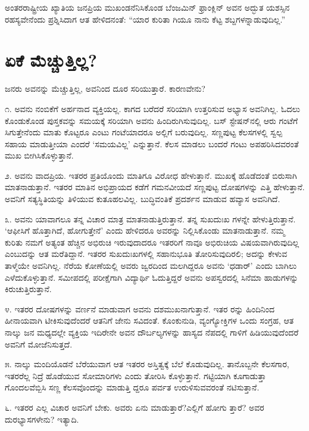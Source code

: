 ಅಂತರರಾಷ್ಟ್ರೀಯ ಖ್ಯಾತಿಯ ಜನಪ್ರಿಯ ಮುಖಂಡನೆನಿಸಿಕೊಂಡ ಬೆಂಜಮಿನ್ ಫ್ರಾಂಕ್ಲಿನ್ ಅವನ ಅದ್ಭುತ ಯಶಸ್ಸಿನ ರಹಸ್ಯವೇನೆಂದು ಪ್ರಶ್ನಿಸಿದಾಗ ಆತ ಹೇಳಿದನಂತೆ: “ಯಾರ ಕುರಿತಾ ಗಿಯೂ ನಾನು ಕೆಟ್ಟ ಶಬ್ದಗಳನ್ನಾಡುವುದಿಲ್ಲ.”


\section{ಏಕೆ ಮೆಚ್ಚುತ್ತಿಲ್ಲ?}

ಜನರು ಅವನನ್ನು ಮೆಚ್ಚುತ್ತಿಲ್ಲ, ಅವನಿಂದ ದೂರ ಸರಿಯುತ್ತಾರೆ. ಕಾರಣವೇನು?

೧. ಅವನು ನಂಬಿಕೆಗೆ ಅರ್ಹನಾದ ವ್ಯಕ್ತಿಯಲ್ಲ. ಕಾಗದ ಬರೆದರೆ ಸರಿಯಾಗಿ ಉತ್ತರಿಸುವ ಅಭ್ಯಾಸ ಅವನಿಗಿಲ್ಲ. ಓದಲು ಕೊಂಡುಕೊಂಡ ಪುಸ್ತಕವನ್ನು ಸಮಯಕ್ಕೆ ಸರಿಯಾಗಿ ಅವನು ಹಿಂದಿರುಗಿಸುವುದಿಲ್ಲ. ಬಸ್ ಸ್ಟೇಷನ್​ನಲ್ಲಿ ಆರು ಗಂಟೆಗೆ ಸಿಗುತ್ತೇನೆಂದು ಮಾತು ಕೊಟ್ಟರೂ ಎಂಟು ಗಂಟೆಯಾದರೂ ಅಲ್ಲಿಗೆ ಬರುವುದಿಲ್ಲ. ಸಣ್ಣಪುಟ್ಟ ಕೆಲಸಗಳಲ್ಲಿ ಸ್ವಲ್ಪ ಸಹಾಯ ಮಾಡುತ್ತೀಯಾ ಎಂದರೆ ‘ಸಮಯವಿಲ್ಲ’ ಎನ್ನುತ್ತಾನೆ. ಕೆಲಸ ಮಾಡಲು ಬಂದರೆ ಗಂಟು ಅಪಹರಿಸಿದವರಂತೆ ಮುಖ ಬೀಗಿಸಿಕೊಳ್ಳುತ್ತಾನೆ.

೨. ಅವನು ವಾದಪ್ರಿಯ. ಇತರರ ಪ್ರತಿಯೊಂದು ಮಾತಿಗೂ ವಿರೋಧ ಹೇಳುತ್ತಾನೆ. ಮುಖಕ್ಕೆ ಹೊಡೆದಂತೆ ಬಿರುಸಾಗಿ ಮಾತನಾಡುತ್ತಾನೆ. ಇತರರ ಮಾತಿನ ಅಭಿಪ್ರಾಯದ ಕಡೆಗೆ ಗಮನವೀಯದೆ ಸಣ್ಣಪುಟ್ಟ ದೋಷಗಳನ್ನು ಎತ್ತಿ ಹೇಳುತ್ತಾನೆ. ಅವನಿಗೆ ಸತ್ಯಸ್ಥಿತಿಯನ್ನು ತಿಳಿಯುವ ಕುತೂಹಲವಿಲ್ಲ. ಬುದ್ಧಿವಂತಿಕೆ ಪ್ರದರ್ಶನ ಮಾಡುವ ಹವ್ಯಾಸ ಅವನಿಗಿದೆ.

೩. ಅವನು ಯಾವಾಗಲೂ ತನ್ನ ವಿಚಾರ ಮಾತ್ರ ಮಾತನಾಡುತ್ತಿರುತ್ತಾನೆ. ತನ್ನ ಸುಖದುಃಖ ಗಳನ್ನೇ ಹೇಳುತ್ತಿರುತ್ತಾನೆ. ‘ಆಫೀಸಿಗೆ ಹೊತ್ತಾಗಿದೆ, ಹೋಗುತ್ತೇನೆ’ ಎಂದು ಹೇಳಿದರೂ ಅವರನ್ನು ನಿಲ್ಲಿಸಿಕೊಂಡು ಮಾತನಾಡುತ್ತಾನೆ. ನಮ್ಮ ಕುರಿತು ನಮಗೆ ಅತ್ಯಂತ ಹೆಚ್ಚಿನ ಅಭಿರುಚಿ ಇರುವುದಾದರೂ ಇತರರಿಗೆ ನಾವೂ ಅಭಿರುಚಿಯ ವಿಷಯವಾಗಿರುವುದಿಲ್ಲ ಎಂಬುದನ್ನು ಆತ ಮರೆತಿದ್ದಾನೆ. ಇತರರ ಸುಖದುಃಖಗಳಲ್ಲಿ ಸಹಾನುಭೂತಿ ತೋರಿಸುವುದಿರಲಿ; ಅದನ್ನು ಕೇಳುವ ತಾಳ್ಮೆಯೇ ಅವನಿಗಿಲ್ಲ. ನೆರೆಯ ಕೋಣೆಯಲ್ಲಿ ಅವರು ಜ್ವರದಿಂದ ಮಲಗಿದ್ದರೂ ಅವನು ‘ಧಡಾರ್​’ ಎಂದು ಬಾಗಿಲು ಎಳೆದುಕೊಳ್ಳುತ್ತಾನೆ. ಸಮೀಪದಲ್ಲಿ ಪರೀಕ್ಷೆಗಾಗಿ ವಿದ್ಯಾರ್ಥಿ ಓದುತ್ತಿದ್ದರೆ ಅವನು ಅಪಸ್ವರದಲ್ಲಿ ಸಿನೆಮಾ ಹಾಡುಗಳನ್ನು ಕಿರುಚುತ್ತಿರುತ್ತಾನೆ.

೪. ಇತರರ ದೋಷಗಳನ್ನು ವರ್ಣನೆ ಮಾಡುವಾಗ ಅವನು ದಶಮುಖನಾಗುತ್ತಾನೆ. ಇತರ ರನ್ನು ಹಿಂದಿನಿಂದ ಹೀನಾಯವಾಗಿ ಟೀಕಿಸುವುದೆಂದರೆ ಆತನಿಗೆ ಜೇನು ಸವಿದಂತೆ. ಕೊಂಕುನುಡಿ, ವ್ಯಂಗ್ಯೋಕ್ತಿಗಳ ಒಂದು ಸಂಗ್ರಹ, ಆತ ನಾಲ್ಕು ಜನ ಮಧ್ಯದಲ್ಲೇ ವ್ಯಕ್ತಿಯ ಇದಿರೇನೇ ಅವನ ದೌರ್ಬಲ್ಯಗಳನ್ನು ಹಾಸ್ಯದ ನೆಪದಲ್ಲಿ ಗಾಳಿಗೆ ಹಿಡಿಯುವುದೆಂದರೆ ಅವನಿಗೆ ಮೋಜೆನಿಸುತ್ತದೆ.

೫. ನಾಲ್ಕು ಮಂದಿಯೊಡನೆ ಬೆರೆಯುವಾಗ ಆತ ಇತರರ ಅಸ್ತಿತ್ವಕ್ಕೆ ಬೆಲೆ ಕೊಡುವುದಿಲ್ಲ. ತಾನೊಬ್ಬನೇ ಕೆಲಸಗಾರ, ಇತರರೆಲ್ಲ ನಿದ್ರೆ ಹೊಡೆಯುವ ಸೋಮಾರಿಗಳು ಎಂದು ತೋರಿಸಿ ಕೊಳ್ಳುತ್ತಾನೆ. ಗಟ್ಟಿಯಾಗಿ ಕೂಗಾಡುತ್ತಾ ಗೊಂದಲವೆಬ್ಬಿಸಿ ಸಣ್ಣ ಕೆಲಸವೊಂದನ್ನು ಮಾಡುತ್ತಿ ದ್ದರೂ ಪರ್ವತ ಉರುಳಿಸುವವರಂತೆ ನಟಿಸುತ್ತಾನೆ.

೬. ಇತರರ ಎಲ್ಲ ವಿಚಾರ ಅವನಿಗೆ ಬೇಕು. ಅವರು ಏನು ಮಾಡುತ್ತಾರೆ?ಎಲ್ಲಿಗೆ ಹೋಗು ತ್ತಾರೆ? ಅವರ ದುರಭ್ಯಾಸಗಳೇನು? ಇತ್ಯಾದಿ.

